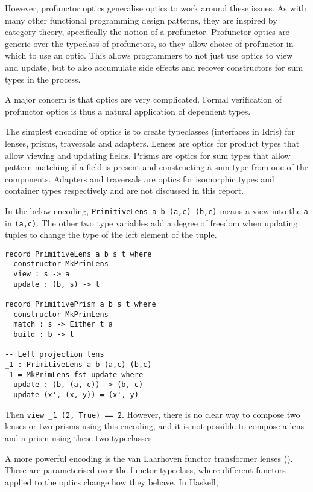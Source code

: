 \documentclass[]{report}
\begin{document}
However, profunctor optics generalise optics to work around these issues. As with many other functional programming design patterns, they are inspired by category theory, specifically the notion of a profunctor. Profunctor optics are generic over the typeclass of profunctors, so they allow choice of profunctor in which to use an optic. This allows programmers to not just use optics to view and update, but to also accumulate side effects and recover constructors for sum types in the process.

A major concern is that optics are very complicated. Formal verification of profunctor optics is thus a natural application of dependent types.

The simplest encoding of optics is to create typeclasses (interfaces in Idris) for lenses, prisms, traversals and adapters. Lenses are optics for product types that allow viewing and updating fields. Prisms are optics for sum types that allow pattern matching if a field is present and constructing a sum type from one of the components. Adapters and traversals are optics for isomorphic types and container types respectively and are not discussed in this report.

In the below encoding, \texttt{PrimitiveLens a b (a,c) (b,c)} means a view into the \texttt{a} in \texttt{(a,c)}. The other two type variables add a degree of freedom when updating tuples to change the type of the left element of the tuple.

\begin{verbatim}
record PrimitiveLens a b s t where
  constructor MkPrimLens
  view : s -> a
  update : (b, s) -> t

record PrimitivePrism a b s t where
  constructor MkPrimLens
  match : s -> Either t a
  build : b -> t

-- Left projection lens
_1 : PrimitiveLens a b (a,c) (b,c)
_1 = MkPrimLens fst update where
  update : (b, (a, c)) -> (b, c)
  update (x', (x, y)) = (x', y)
\end{verbatim}

Then \texttt{view \_1 (2, True) == 2}. However, there is no clear way to compose two lenses or two prisms using this encoding, and it is not possible to compose a lens and a prism using these two typeclasses.

A more powerful encoding is the van Laarhoven functor transformer lenses (\cite{laarhoven2011lens}). These are parameterised over the functor typeclass, where different functors applied to the optics change how they behave. In Haskell,
\end{document}
